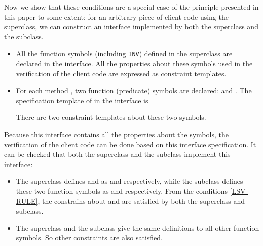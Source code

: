 \documentclass[fleqn]{llncs}
\begin{document}
Now we show that these conditions are a special case of the principle presented in this paper to some extent: for an arbitrary piece of
client code using the superclass, we can
construct an interface implemented by both the superclass and the subclass.
\begin{itemize}
\item   All the function symbols (including \texttt{INV}) defined in the superclass are declared in the interface.
        All the properties about these symbols used in the verification of the client code are expressed as constraint templates.
\item For each method , two function (predicate) symbols are declared:  and . The specification template of  in the interface is
        
    There are two constraint templates about these two symbols.
        
\end{itemize}
Because this interface contains all the properties about the symbols, the verification of the client code can be done based on this interface specification.
It can be checked that both the superclass and the subclass implement this interface:
\begin{itemize}
\item The superclass defines  and  as  and  respectively, while
the subclass defines these two function symbols as  and  respectively.
From the conditions \ref{LSV-RULE}, the constrains about   and  are satisfied by both the superclass and subclass.
\item The superclass and the subclass give the same definitions to all other function symbols. So other constraints are also satisfied.
\end{itemize}
\end{document}

